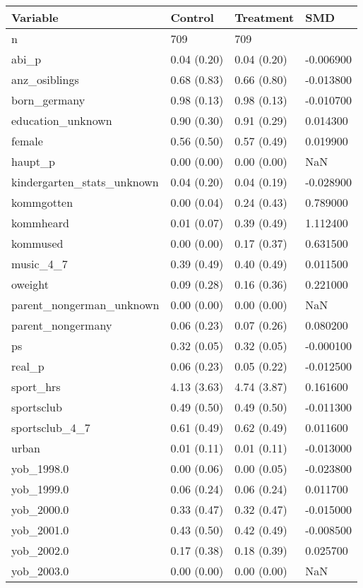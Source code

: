 \begin{tabular}{llll}
\toprule
Variable & Control & Treatment & SMD \\
\midrule
n & 709 & 709 &  \\
abi\_p & 0.04 (0.20) & 0.04 (0.20) & -0.006900 \\
anz\_osiblings & 0.68 (0.83) & 0.66 (0.80) & -0.013800 \\
born\_germany & 0.98 (0.13) & 0.98 (0.13) & -0.010700 \\
education\_unknown & 0.90 (0.30) & 0.91 (0.29) & 0.014300 \\
female & 0.56 (0.50) & 0.57 (0.49) & 0.019900 \\
haupt\_p & 0.00 (0.00) & 0.00 (0.00) & NaN \\
kindergarten\_stats\_unknown & 0.04 (0.20) & 0.04 (0.19) & -0.028900 \\
kommgotten & 0.00 (0.04) & 0.24 (0.43) & 0.789000 \\
kommheard & 0.01 (0.07) & 0.39 (0.49) & 1.112400 \\
kommused & 0.00 (0.00) & 0.17 (0.37) & 0.631500 \\
music\_4\_7 & 0.39 (0.49) & 0.40 (0.49) & 0.011500 \\
oweight & 0.09 (0.28) & 0.16 (0.36) & 0.221000 \\
parent\_nongerman\_unknown & 0.00 (0.00) & 0.00 (0.00) & NaN \\
parent\_nongermany & 0.06 (0.23) & 0.07 (0.26) & 0.080200 \\
ps & 0.32 (0.05) & 0.32 (0.05) & -0.000100 \\
real\_p & 0.06 (0.23) & 0.05 (0.22) & -0.012500 \\
sport\_hrs & 4.13 (3.63) & 4.74 (3.87) & 0.161600 \\
sportsclub & 0.49 (0.50) & 0.49 (0.50) & -0.011300 \\
sportsclub\_4\_7 & 0.61 (0.49) & 0.62 (0.49) & 0.011600 \\
urban & 0.01 (0.11) & 0.01 (0.11) & -0.013000 \\
yob\_1998.0 & 0.00 (0.06) & 0.00 (0.05) & -0.023800 \\
yob\_1999.0 & 0.06 (0.24) & 0.06 (0.24) & 0.011700 \\
yob\_2000.0 & 0.33 (0.47) & 0.32 (0.47) & -0.015000 \\
yob\_2001.0 & 0.43 (0.50) & 0.42 (0.49) & -0.008500 \\
yob\_2002.0 & 0.17 (0.38) & 0.18 (0.39) & 0.025700 \\
yob\_2003.0 & 0.00 (0.00) & 0.00 (0.00) & NaN \\
\bottomrule
\end{tabular}
